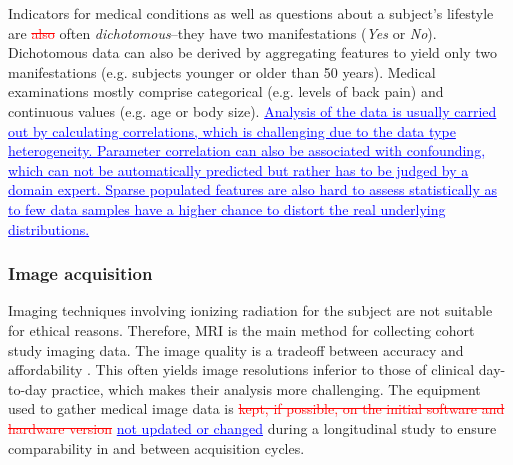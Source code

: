\documentclass[journal]{style/vgtc} 			          %
\newcommand{\rem}[1]{\textcolor{red}{\sout{#1}}}
\newcommand{\add}[1]{\textcolor{blue}{\uline{#1}}}
\begin{document}
Indicators for medical conditions as well as questions about a subject's lifestyle are \rem{also} often \emph{dichotomous}--they have two manifestations (\emph{Yes} or \emph{No}).
%
Dichotomous data can also be derived by aggregating features to yield only two manifestations (e.g. subjects younger or older than 50 years).
%
Medical examinations mostly comprise categorical (e.g. levels of back pain) and continuous values (e.g. age or body size).
%
\add{Analysis of the data is usually carried out by calculating correlations,
which is challenging due to the data type heterogeneity.
%
Parameter correlation can also be associated with confounding, which can not be automatically predicted but rather has to be judged by a domain expert.
%
Sparse populated features are also hard to assess statistically as to few data samples have a higher chance to distort the real underlying distributions.
}

\subsubsection{Image acquisition} \label{ImageAcquisition} Imaging techniques involving ionizing radiation for the subject are not suitable for ethical reasons.
%
Therefore, MRI is the main method for collecting cohort study imaging data.
%
The image quality is a tradeoff between accuracy and affordability \cite{Preim2014}.
%
This often yields image resolutions inferior to those of clinical day-to-day practice, which makes their analysis more challenging.
%
The equipment used to gather medical image data is \rem{kept, if possible, on the initial software and hardware version} \add{not updated or changed} during a longitudinal study to ensure comparability in and between acquisition cycles.
\end{document}
